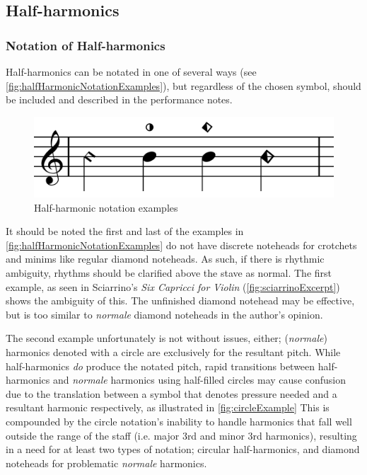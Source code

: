 \subsection{Half-harmonics} \label{sec:half-harmonics}

\subsubsection{Notation of Half-harmonics}
Half-harmonics can be notated in one of several ways (see \autoref{fig:halfHarmonicNotationExamples}), but regardless of the chosen symbol, should be included and described in the performance notes.


\begin{figure}
    \includegraphics[width=\linewidth]{./resources/halfHarmonicNotationExamples.pdf}
    \caption{Half-harmonic notation examples} \label{fig:halfHarmonicNotationExamples}
  \end{figure}

It should be noted the first and last of the examples in \autoref{fig:halfHarmonicNotationExamples} do not have discrete noteheads for crotchets and minims like regular diamond noteheads.
As such, if there is rhythmic ambiguity, rhythms should be clarified above the stave as normal.
The first example, as seen in Sciarrino's \emph{Six Capricci for Violin} (\autoref{fig:sciarrinoExcerpt}) shows the ambiguity of this.
The unfinished diamond notehead may be effective, but is too similar to \emph{normale} diamond noteheads in the author's opinion.

The second example unfortunately is not without issues, either; (\emph{normale}) harmonics denoted with a circle are exclusively for the resultant pitch.\autocite[419]{gouldBars2011} 
While half-harmonics \emph{do} produce the notated pitch, rapid transitions between half-harmonics and \emph{normale} harmonics using half-filled circles may cause confusion due to the translation between a symbol that denotes pressure needed and a resultant harmonic respectively, as illustrated in \autoref{fig:circleExample}
This is compounded by the circle notation's inability to handle harmonics that fall well outside the range of the staff (i.e. major 3rd and minor 3rd harmonics), resulting in a need for at least two types of notation; circular half-harmonics, and diamond noteheads for problematic \emph{normale} harmonics.

